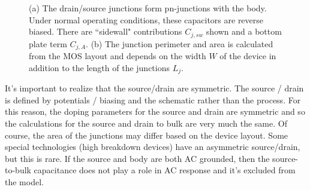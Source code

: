 \begin{figure}[tb]
\centering
{}
\caption{(a) The drain/source junctions form pn-junctions with the body.  Under normal operating conditions, these capacitors are reverse biased.  There are ``sidewall" contributions $C_{j,sw}$ shown and a bottom plate term $C_{j,A}$.  (b)  The junction perimeter and area is calculated from the MOS layout and depends on the width $W$ of the device in addition to the length of the junctions $L_j$.} 
\end{figure}
It's important to realize that the source/drain are symmetric.  The source / drain is defined by potentials / biasing and the schematic rather than the process. For this reason, the doping parameters for the source and drain are symmetric and so the calculations for the source and drain to bulk are very much the same.  Of course, the area of the junctions may differ based on the device layout.	Some special technologies (high breakdown devices) have an asymmetric source/drain, but this is rare.	 If the source and body are both AC grounded, then the source-to-bulk capacitance does not play a role in AC response and it's excluded from the model.
